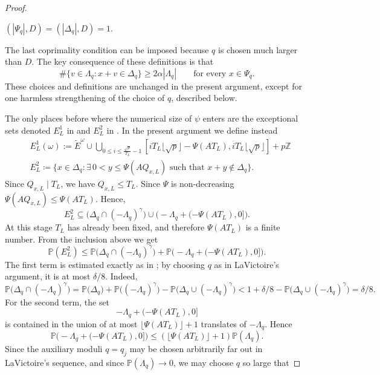 \documentclass[12pt,leqno]{amsart}
\def\Z {{\mathbb Z}}
\numberwithin{equation}{section}
\numberwithin{counter2}{section}
\theoremstyle{definition}
\theoremstyle{plain}
\begin{document}
\begin{proof}
\begin{itemize}
$	(|\Psi_q|,D)=(|\Delta_q|,D)=1.
$

\end{itemize}
	The last coprimality condition can be imposed because \(q\) is chosen much
	larger than \(D\). The key consequence of these definitions is that
	\[
	\#\{v\in\Lambda_q:x+v\in\Delta_q\}
	\geq
	2\alpha|\Lambda_q|
	\qquad
	\text{for every }x\in\Psi_q.
	\]
	These choices and definitions are unchanged in the present argument, except for
	one harmless strengthening of the choice of \(q\), described below.
	
	The only places before \cite[Section~8]{L9} where the numerical size of \(\psi\) enters are
	the exceptional sets denoted $E_L^1$ in \cite[(5.2)]{L9} and  \(E_L^2\) in \cite[(6.9)]{L9}. In the present
	argument we define instead
	\[\begin{split}& E_L^1(\omega):= \tilde E^\omega \cup\bigcup_{0\leq i\leq\frac{\sqrt p}{T_L} -1} [iT_L\lfloor\sqrt p\rfloor -\Psi(AT_L),iT_L\lfloor\sqrt p\rfloor]+p\Z
	\\ &	E_L^2
\coloneqq 
	\{x\in\Delta_q:\exists\,0<y\leq \Psi(AQ_{x,L})
	\text{ such that }x+y\notin\Delta_q\}.
\end{split}
	\]
	Since \(Q_{x,L}\mid T_L\), we have \(Q_{x,L}\leq T_L\). Since \(\Psi\) is
	non-decreasing $	\Psi(AQ_{x,L})\leq \Psi(AT_L).$ 	Hence,
	\[
	E_L^2
	\subseteq
	\bigl(\Delta_q\cap(-\Lambda_q)^\gamma\bigr)
	\cup
	\bigl(-\Lambda_q+(-\Psi(AT_L),0]\bigr).
	\]
	At this stage \(T_L\) has already been fixed, and therefore \(\Psi(AT_L)\) is a
	finite number. From the inclusion above we get
	\[
	\mathbb P(E_L^2)
	\leq
	\mathbb P\bigl(\Delta_q\cap(-\Lambda_q)^\gamma\bigr)
	+
	\mathbb P\bigl(-\Lambda_q+(-\Psi(AT_L),0]\bigr).	\]
	The first term is estimated exactly as in \cite[(6.9)]{L9}; by choosing \(q\)
	as in LaVictoire's argument, it is at most \(\delta/8\). Indeed,
    $$\mathbb P\bigl(\Delta_q\cap(-\Lambda_q)^\gamma\bigr) = \mathbb P\bigl(\Delta_q\bigr)+\mathbb P\bigl((-\Lambda_q)^\gamma\bigr) - \mathbb P\bigl(\Delta_q\cup(-\Lambda_q)^\gamma\bigr) < 1+\delta/8  - \mathbb P\bigl(\Delta_q\cup(-\Lambda_q)^\gamma\bigr)= \delta/8.$$
    For the second term,
	the set
	\[
	-\Lambda_q+(-\Psi(AT_L),0]
	\]
	is contained in the union of at most \(\lfloor \Psi(AT_L)\rfloor+1\) translates
	of \(-\Lambda_q\). Hence
	\[
	\mathbb P\bigl(-\Lambda_q+(-\Psi(AT_L),0]\bigr)
	\leq
	(\lfloor \Psi(AT_L)\rfloor+1)\mathbb P(\Lambda_q).
	\]
	Since the auxiliary moduli \(q=q_j\) may be chosen arbitrarily far out in
	LaVictoire's sequence, and since \(\mathbb P(\Lambda_q)\to0\), we may choose
	\(q\) so large that

\end{proof}
\end{document}
